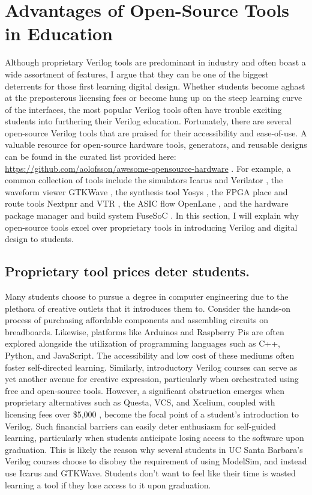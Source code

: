 
\chapter{Advantages of Open-Source Tools in Education}
\label{chapter:open_source_tools}

Although proprietary Verilog tools are predominant in industry and often boast a wide assortment of features, I argue that they can be one of the biggest deterrents for those first learning digital design. Whether students become aghast at the preposterous licensing fees or become hung up on the steep learning curve of the interfaces, the most popular Verilog tools often have trouble exciting students into furthering their Verilog education. Fortunately, there are several open-source Verilog tools that are praised for their accessibility and ease-of-use. A valuable resource for open-source hardware tools, generators, and reusable designs can be found in the curated list provided here: \url{https://github.com/aolofsson/awesome-opensource-hardware} \cite{awesomeOpenSourceHardware}. For example, a common collection of tools include the simulators Icarus \cite{icarusGitHub} and Verilator \cite{verilatorGitHub}, the waveform viewer GTKWave \cite{gtkwaveGitHub}, the synthesis tool Yosys \cite{yosysGitHub}, the FPGA place and route tools Nextpnr \cite{nextpnrGitHub} and VTR \cite{vtrGitHub}, the ASIC flow OpenLane \cite{OpenLaneGitHub}, and the hardware package manager and build system FuseSoC \cite{fusesocGitHub, edalizeGitHub}. In this section, I will explain why open-source tools excel over proprietary tools in introducing Verilog and digital design to students.

\section{Proprietary tool prices deter students.}

Many students choose to pursue a degree in computer engineering due to the plethora of creative outlets that it introduces them to. Consider the hands-on process of purchasing affordable components and assembling circuits on breadboards. Likewise, platforms like Arduinos and Raspberry Pis are often explored alongside the utilization of programming languages such as C++, Python, and JavaScript. The accessibility and low cost of these mediums often foster self-directed learning. Similarly, introductory Verilog courses can serve as yet another avenue for creative expression, particularly when orchestrated using free and open-source tools. However, a significant obstruction emerges when proprietary alternatives such as Questa, VCS, and Xcelium, coupled with licensing fees over \$5,000 \cite{olofssonLatchUp, licensePricesReddit}, become the focal point of a student's introduction to Verilog. Such financial barriers can easily deter enthusiasm for self-guided learning, particularly when students anticipate losing access to the software upon graduation. This is likely the reason why several students in UC Santa Barbara's Verilog courses choose to disobey the requirement of using ModelSim, and instead use Icarus and GTKWave. Students don't want to feel like their time is wasted learning a tool if they lose access to it upon graduation.

